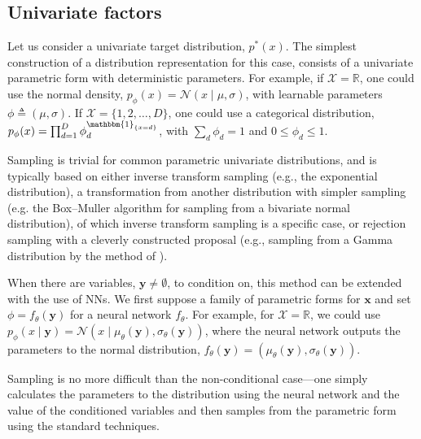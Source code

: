 
\subsection{Univariate factors}
\label{sec:univariate-factors}
Let us consider a univariate target distribution, $p^*(x)$. The simplest construction of a distribution representation for this case, consists of a univariate parametric form with deterministic parameters. For example, if $\mathcal{X}=\mathbb{R}$, one could use the normal density, $p_\phi(x)=\mathcal{N}(x\mid\mu,\sigma)$, with learnable parameters $\phi\triangleq(\mu,\sigma)$. If $\mathcal{X}=\{1,2,\ldots,D\}$, one could use a categorical distribution, $p_\phi(x)=\prod^D_{d=1}\phi_d^{\mathbbm{1}_{\{x=d\}}}$, with $\sum_d\phi_d=1$ and $0\le\phi_d\le1$.

Sampling is trivial for common parametric univariate distributions, and is typically based on either inverse transform sampling (e.g., the exponential distribution), a transformation from another distribution with simpler sampling (e.g. the Box--Muller algorithm \citep{Box1958} for sampling from a bivariate normal distribution), of which inverse transform sampling is a specific case, or rejection sampling with a cleverly constructed proposal (e.g., sampling from a Gamma distribution by the method of \citet{MarsagliaTsang2000}).

When there are variables, $\mathbf{y}\neq\emptyset$, to condition on, this method can be extended with the use of NNs. We first suppose a family of parametric forms for $\mathbf{x}$ and set $\phi=f_\theta(\mathbf{y})$ for a neural network $f_\theta$. For example, for $\mathcal{X}=\mathbb{R}$, we could use $p_\phi(x\mid\mathbf{y})=\mathcal{N}(x\mid\mu_\theta(\mathbf{y}),\sigma_\theta(\mathbf{y}))$, where the neural network outputs the parameters to the normal distribution, $f_\theta(\mathbf{y})=(\mu_\theta(\mathbf{y}),\sigma_\theta(\mathbf{y}))$.

Sampling is no more difficult than the non-conditional case---one simply calculates the parameters to the distribution using the neural network and the value of the conditioned variables and then samples from the parametric form using the standard techniques.


